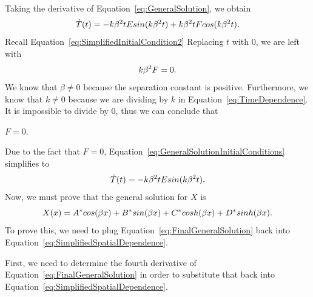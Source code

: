 \documentclass[12pt]{article}
\begin{document}
Taking the derivative of Equation~\eqref{eq:GeneralSolution}, we obtain
\begin{equation}\label{eq:GeneralSolutionInitialConditions}
    \centering
    \dot{T}(t)=-k\beta^2tEsin(k\beta^2t)+k\beta^2tFcos(k\beta^2t).
\end{equation}
Recall Equation~\eqref{eq:SimplifiedInitialCondition2} Replacing $t$ with $0$, we are left with
\begin{equation}\label{eq:GeneralSolutionAnswer}
    \centering
    k\beta^2F=0.
\end{equation}
We know that $\beta\neq0$ because the separation constant is positive. Furthermore, we know that $k\neq0$ because we are dividing by $k$ in Equation~\eqref{eq:TimeDependence}. It is impossible to divide by 0, thus we can conclude that \\

\centerline{$F=0$.}

Due to the fact that $F=0$, Equation~\eqref{eq:GeneralSolutionInitialConditions} simplifies to 
\begin{equation}\label{eq:SimplifiedGeneralSolutionInitialConditions}
    \centering
    \dot{T}(t)=-k\beta^2tEsin(k\beta^2t).
\end{equation}
Now, we must prove that the general solution for $X$ is
\begin{equation}\label{eq:FinalGeneralSolution}
    \centering
    X(x)=A^*cos(\beta x)+B^*sin(\beta x)+C^*cosh(\beta x)+D^*sinh(\beta x).
\end{equation}
To prove this, we need to plug Equation~\eqref{eq:FinalGeneralSolution} back into Equation~\eqref{eq:SimplifiedSpatialDependence}.

First, we need to determine the fourth derivative of Equation~\eqref{eq:FinalGeneralSolution} in order to substitute that back into Equation~\eqref{eq:SimplifiedSpatialDependence}.
\end{document}
